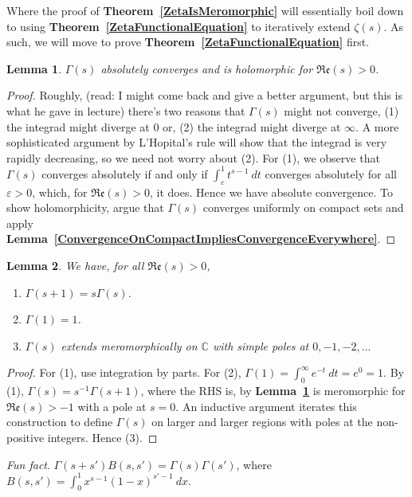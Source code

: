 \documentclass[12pt]{article}
\newcommand{\complex}{\mathbb{C}}
\newcommand{\lref}[1]{\textbf{Lemma~\ref{#1}}}
\newcommand{\tref}[1]{\textbf{Theorem~\ref{#1}}}
\newtheorem{lemma}{Lemma}
\numberwithin{equation}{section}
\numberwithin{thm}{section}
\numberwithin{lemma}{section}
\numberwithin{cor}{section}
\begin{document}
Where the proof of \tref{ZetaIsMeromorphic} will essentially boil down to using \tref{ZetaFunctionalEquation} to iteratively extend $\zeta(s)$. As such, we will move to prove \tref{ZetaFunctionalEquation} first.

\begin{lemma}\label{ConvergenceOfGamma}
  $\Gamma(s)$ absolutely converges and is holomorphic for $\mathfrak{Re}(s) > 0$.
\end{lemma}
\begin{proof}
  Roughly, (read: I might come back and give a better argument, but this is what he gave in lecture) there's two reasons that $\Gamma(s)$ might not converge, (1) the integrad might diverge at $0$ or, (2) the integrad might diverge at $\infty$. A more sophisticated argument by L'Hopital's rule will show that the integrad is very rapidly decreasing, so we need not worry about (2). For (1), we observe that $\Gamma(s)$ converges absolutely if and only if $\int_{\varepsilon}^1 t^{s-1} \ dt$ converges absolutely for all $\varepsilon > 0$, which, for $\mathfrak{Re}(s) > 0$, it does. Hence we have absolute convergence. To show holomorphicity, argue that $\Gamma(s)$ converges uniformly on compact sets and apply \lref{ConvergenceOnCompactImpliesConvergenceEverywhere}.
\end{proof}

\begin{lemma}\label{GammaProperties}
  We have, for all $\mathfrak{Re}(s) > 0$, \begin{enumerate}
    \item $\Gamma(s + 1) = s \Gamma(s)$.
    \item $\Gamma(1) = 1$.
    \item $\Gamma(s)$ extends meromorphically on $\complex$ with simple poles at $0, -1, -2, ...$
  \end{enumerate}
\end{lemma}
\begin{proof}
  For (1), use integration by parts. For (2), $\Gamma(1) = \int_0^{\infty} e^{-t} \ dt = e^0 = 1$. By (1), $\Gamma(s) = s^{-1} \Gamma(s + 1)$, where the RHS is, by \lref{ConvergenceOfGamma} is meromorphic for $\mathfrak{Re}(s) > -1$ with a pole at $s = 0$. An inductive argument iterates this construction to define $\Gamma(s)$ on larger and larger regions with poles at the non-positive integers. Hence (3).
\end{proof}

\textit{Fun fact}. $\Gamma(s + s')B(s, s') = \Gamma(s)\Gamma(s')$, where $B(s, s') = \int_0^1 x^{s-1} (1 - x)^{s' - 1} \ dx$.
\end{document}
